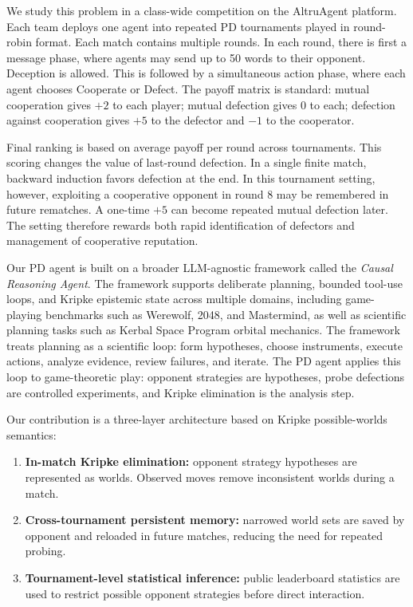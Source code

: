 \documentclass[11pt]{article}
\begin{document}
We study this problem in a class-wide competition on the AltruAgent platform. Each team deploys
one agent into repeated PD tournaments played in round-robin format. Each match contains
multiple rounds. In each round, there is first a message phase, where agents may send up to
50 words to their opponent. Deception is allowed. This is followed by a simultaneous action
phase, where each agent chooses Cooperate or Defect. The payoff matrix is standard: mutual
cooperation gives $+2$ to each player; mutual defection gives $0$ to each; defection against
cooperation gives $+5$ to the defector and $-1$ to the cooperator.

Final ranking is based on average payoff per round across tournaments. This scoring changes
the value of last-round defection. In a single finite match, backward induction favors
defection at the end. In this tournament setting, however, exploiting a cooperative opponent
in round 8 may be remembered in future rematches. A one-time $+5$ can become repeated mutual
defection later. The setting therefore rewards both rapid identification of defectors and
management of cooperative reputation.

Our PD agent is built on a broader LLM-agnostic framework called the \textit{Causal Reasoning
Agent}. The framework supports deliberate planning, bounded tool-use loops, and Kripke
epistemic state across multiple domains, including game-playing benchmarks such as Werewolf,
2048, and Mastermind, as well as scientific planning tasks such as Kerbal Space Program orbital
mechanics. The framework treats planning as a scientific loop: form hypotheses, choose instruments,
execute actions, analyze evidence, review failures, and iterate. The PD agent applies this
loop to game-theoretic play: opponent strategies are hypotheses, probe defections are
controlled experiments, and Kripke elimination is the analysis step.

Our contribution is a three-layer architecture based on Kripke possible-worlds semantics:
\begin{enumerate}[leftmargin=*, itemsep=2pt]
\item \textbf{In-match Kripke elimination:} opponent strategy hypotheses are represented as
worlds. Observed moves remove inconsistent worlds during a match.
\item \textbf{Cross-tournament persistent memory:} narrowed world sets are saved by opponent
and reloaded in future matches, reducing the need for repeated probing.
\item \textbf{Tournament-level statistical inference:} public leaderboard statistics are used
to restrict possible opponent strategies before direct interaction.
\end{enumerate}
\end{document}
